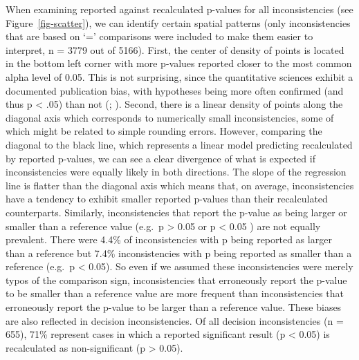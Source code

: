 \documentclass[
  doc,
  longtable,
  nolmodern,
  notxfonts,
  notimes,
  colorlinks=true,linkcolor=blue,citecolor=blue,urlcolor=blue]{apa7}
\begin{document}
When examining reported against recalculated p-values for all
inconsistencies (see Figure~\ref{fig-scatter}), we can identify certain
spatial patterns (only inconsistencies that are based on `=' comparisons
were included to make them easier to interpret, n = 3779 out of 5166).
First, the center of density of points is located in the bottom left
corner with more p-values reported closer to the most common alpha level
of 0.05. This is not surprising, since the quantitative sciences exhibit
a documented publication bias, with hypotheses being more often
confirmed (and thus p \textless{} .05) than not
(;
). Second, there
is a linear density of points along the diagonal axis which corresponds
to numerically small inconsistencies, some of which might be related to
simple rounding errors. However, comparing the diagonal to the black
line, which represents a linear model predicting recalculated by
reported p-values, we can see a clear divergence of what is expected if
inconsistencies were equally likely in both directions. The slope of the
regression line is flatter than the diagonal axis which means that, on
average, inconsistencies have a tendency to exhibit smaller reported
p-values than their recalculated counterparts. Similarly,
inconsistencies that report the p-value as being larger or smaller than
a reference value (e.g.~p \textgreater{} 0.05 or p \textless{} 0.05 )
are not equally prevalent. There were 4.4\% of inconsistencies with p
being reported as larger than a reference but 7.4\% inconsistencies with
p being reported as smaller than a reference (e.g.~p \textless{} 0.05).
So even if we assumed these inconsistencies were merely typos of the
comparison sign, inconsistencies that erroneously report the p-value to
be smaller than a reference value are more frequent than inconsistencies
that erroneously report the p-value to be larger than a reference value.
These biases are also reflected in decision inconsistencies. Of all
decision inconsistencies (n = 655), 71\% represent cases in which a
reported significant result (p \textless{} 0.05) is recalculated as
non-significant (p \textgreater{} 0.05).
\end{document}
